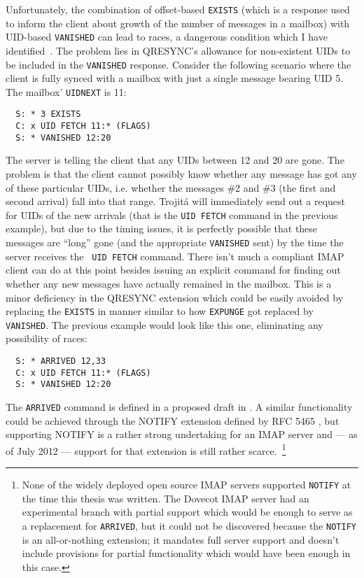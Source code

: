 \documentclass[trojita]{subfiles}
\begin{document}
Unfortunately, the combination of offset-based {\tt EXISTS} (which is a response used to inform the client about growth
of the number of messages in a mailbox) with UID-based {\tt VANISHED} can lead to races, a dangerous condition which I
have identified~\cite{kundrat-vanished-race}.  The problem lies in QRESYNC's allowance for non-existent UIDs to be
included in the {\tt VANISHED} response.  Consider the following scenario where the client is fully synced with a
mailbox with just a single message bearing UID 5.  The mailbox' {\tt UIDNEXT} is 11:

\begin{verbatim}
  S: * 3 EXISTS
  C: x UID FETCH 11:* (FLAGS)
  S: * VANISHED 12:20
\end{verbatim}

The server is telling the client that any UIDs between 12 and 20 are gone.  The problem is that the client cannot
possibly know whether any message has got any of these particular UIDs, i.e. whether the messages \#2 and \#3 (the first
and second arrival) fall into that range.  Trojitá will immediately send out a request for UIDs of the new arrivals
(that is the {\tt UID FETCH} command in the previous example), but due to the timing issues, it is perfectly possible
that these messages are ``long'' gone (and the appropriate {\tt VANISHED} sent) by the time the server receives the {\tt
UID FETCH} command.  There isn't much a compliant IMAP client can do at this point besides issuing an explicit command
for finding out whether any new messages have actually remained in the mailbox.  This is a minor deficiency in the
QRESYNC extension which could be easily avoided by replacing the {\tt EXISTS} in manner similar to how {\tt EXPUNGE} got
replaced by {\tt VANISHED}.  The previous example would look like this one, eliminating any possibility of races:

\begin{verbatim}
  S: * ARRIVED 12,33
  C: x UID FETCH 11:* (FLAGS)
  S: * VANISHED 12:20
\end{verbatim}

The {\tt ARRIVED} command is defined in a proposed draft in .  A similar functionality could
be achieved through the NOTIFY extension defined by RFC 5465 \cite{rfc5465}, but supporting NOTIFY is a rather strong
undertaking for an IMAP server and --- as of July 2012 --- support for that extension is still rather
scarce.~\footnote{None of the widely deployed open source IMAP servers supported {\tt NOTIFY} at the time this thesis
was written.  The Dovecot IMAP server had an experimental branch with partial support which would be enough to serve as
a replacement for {\tt ARRIVED}, but it could not be discovered because the {\tt NOTIFY} is an all-or-nothing extension;
it mandates full server support and doesn't include provisions for partial functionality which would have been enough in
this case.}
\end{document}
